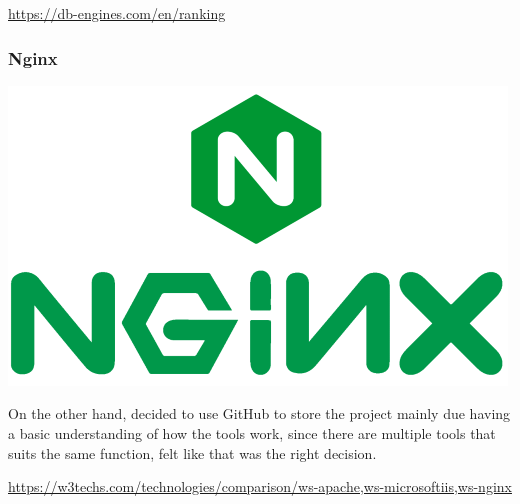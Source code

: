 \documentclass[11pt]{article}
\begin{document}
        \url{https://db-engines.com/en/ranking}

        \subsubsection[Nginx]{Nginx}

        \begin{center}
            \includegraphics[scale=0.3]{logo_nginx}
        \end{center}
        \begin{flushleft}
                On the other hand, decided to use GitHub to store the project mainly due having a basic understanding of how
                the tools work, since there are multiple tools that suits the same function, felt like that was the right decision.
        \end{flushleft}


        \begin{flushleft}
            \url{https://w3techs.com/technologies/comparison/ws-apache,ws-microsoftiis,ws-nginx}
        \end{flushleft}
\end{document}
